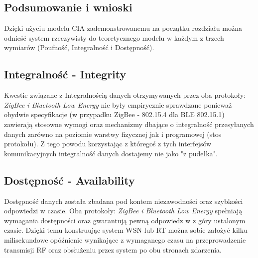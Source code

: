\subsection{Podsumowanie i wnioski}

\par
\tab Dzięki użyciu modelu CIA zademonstrowanemu na początku rozdziału można odnieść system rzeczywisty do teoretycznego modelu w każdym z trzech wymiarów (Poufność, Integralność i Dostępność).

\subsection{Integralność - Integrity}
\par
\tab Kwestie związane z Integralnością danych otrzymywanych przez oba protokoły: \textit{ZigBee i Bluetooth Low Energy} nie były empirycznie sprawdzane ponieważ obydwie specyfikacje (w przypadku ZigBee - 802.15.4 dla BLE 802.15.1) zawierają stosowne wymogi oraz mechanizmy dbające o integralność przesyłanych danych zarówno na poziomie warstwy fizycznej jak i programowej (stos protokołu). Z tego powodu korzystając z któregoś z tych interfejsów komunikacyjnych integralność danych dostajemy nie jako "z pudełka".


\subsection{Dostępność - Availability}
\par
\tab Dostępność danych została zbadana pod kontem niezawodności oraz szybkości odpowiedzi w czasie. Oba protokoły: \textit{ZigBee i Bluetooth Low Energy} spełniają wymagania dostępności oraz gwarantują pewną odpowiedz w z góry ustalonym czasie.
Dzięki temu konstruując system WSN lub RT można sobie założyć kilku milisekundowe opóźnienie wynikające z wymaganego czasu na przeprowadzenie transmisji RF oraz obsłużeniu przez system po obu stronach zdarzenia.


